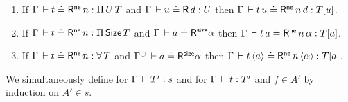 \documentclass[acmlarge,review,anonymous]{acmart}\settopmatter{printfolios=true}
\begin{document}
\begin{lemma}
\label{lem:rclosne}
\bla
\begin{enumerate}
\item If\/ $\Gamma \,\vdash t \doteq \mathsf{R}^{\mathsf{ne}}\, n : \Pi\,U\, T$ and $\Gamma \,\vdash u \doteq \mathsf{R}\, d : U$ then $\Gamma \,\vdash t\,u \doteq \mathsf{R}^{\mathsf{ne}}\, n\,d : T[u]$.
\item If\/ $\Gamma \,\vdash t \doteq \mathsf{R}^{\mathsf{ne}}\, n : \Pi\,\mathsf{Size}\, T$ and $\Gamma \,\vdash a \doteq \mathsf{R}^{\mathsf{size}} \alpha$ then $\Gamma \,\vdash t\,a \doteq \mathsf{R}^{\mathsf{ne}}\, n\,\alpha : T[a]$.
\item If\/ $\Gamma \,\vdash t \doteq \mathsf{R}^{\mathsf{ne}}\, n : \forall\, T$ and $\RSIZE {\resurrect\Gamma} a \alpha$ then $\Gamma \,\vdash t\,\langle a\rangle \doteq \mathsf{R}^{\mathsf{ne}}\, n\,\langle\alpha\rangle : T[a]$.
\end{enumerate}
\end{lemma}

We simultaneously define
 for $\Gamma \,\vdash T' : s$
and  for $\Gamma \,\vdash t : T'$ and $f \in A'$
by induction on ${A'} \in s$.
\end{document}
